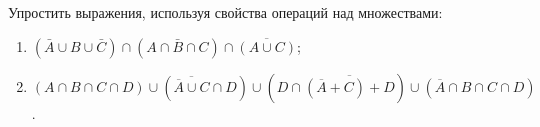 \question
Упростить выражения, используя свойства операций над множествами:

\begin{enumerate}
	\renewcommand{\labelenumi}{\alph{enumi})}
	\item $(\bar{A} \cup B \cup \bar{C}) \cap(A \cap \bar{B} \cap C) \cap \overline{(A \cup C)}$;
	\item $(A\cap B \cap C \cap D) \cup (\overline{\overline{A}\cup C}\cap D) \cup (D\cap\overline{(\overline{A}+C)+D})\cup (\overline{A}\cap B\cap C \cap D)$.
\end{enumerate}
